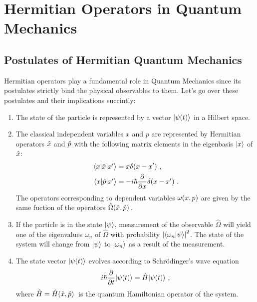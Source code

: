\chapter{Hermitian Operators in Quantum Mechanics}\label{ch:hermiticity}
    \section{Postulates of Hermitian Quantum Mechanics}
        Hermitian operators play a fundamental role in Quantum Mechanics since its postulates strictly bind the physical observables to them. Let's go over these postulates \cite{Shankar2012-kg} and their implications \cite{Shankar2012-kg,Sakurai2020-pu} succintly:
        \begin{enumerate}[label=\Roman*.] 
            \item The state of the particle is represented by a vector $\ket{\psi\pqty{t}}$ in a Hilbert space.
            \item The classical independent variables $x$ and $p$ are represented by Hermitian operators $\hat{x}$ and $\hat{p}$ with the following matrix elements in the eigenbasis $\ket{x}$ of $\hat{x}$:
            \begin{align*}
                \mel*{x}{\hx}{x'} &= x\delta\pqty*{x-x'} \mycomma \\
                \mel*{x}{\hp}{x'} &= -i\hbar\pdv{x}\delta\pqty*{x-x'} \myperiod
            \end{align*}
            The operators corresponding to dependent variables $\omega\pqty{x,p}$ are given by the same fuction of the operators $\hat{\Omega}\pqty*{\hx,\hp}$.
            \item If the particle is in the state $\ket{\psi}$, measurement of the observable $\hat{\Omega}$ will yield one of the eigenvalues $\omega_n$ of $\hat{\Omega}$ with probability $\abs{\braket{\omega_n}{\psi}}^2$. The state of the system will change from $\ket{\psi}$ to $\ket{\omega_n}$ as a result of the measurement.
            \item The state vector $\ket{\psi\pqty{t}}$ evolves according to Schr\"odinger's wave equation
            \begin{equation}
                i\hbar\pdv{t}\!\ket{\psi\pqty{t}} = \hH\!\ket{\psi\pqty{t}}
                \mycomma
                \label{eq:schrodinger}
            \end{equation}
            where $\hH = \hH\pqty*{\hx,\hp}$ is the quantum Hamiltonian operator of the system.
        \end{enumerate}

